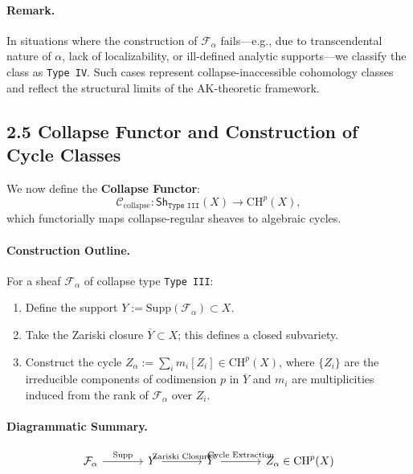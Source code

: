 \documentclass[11pt]{article}
\begin{document}
\paragraph{Remark.}
In situations where the construction of $\mathcal{F}_\alpha$ fails—e.g., due to transcendental nature of $\alpha$, lack of localizability, or ill-defined analytic supports—we classify the class as \texttt{Type IV}. Such cases represent collapse-inaccessible cohomology classes and reflect the structural limits of the AK-theoretic framework.

\subsection{2.5 Collapse Functor and Construction of Cycle Classes}

We now define the \textbf{Collapse Functor}:
\[
\mathcal{C}_{\text{collapse}} : \mathsf{Sh}_{\texttt{Type III}}(X) \longrightarrow \mathrm{CH}^p(X),
\]
which functorially maps collapse-regular sheaves to algebraic cycles.

\paragraph{Construction Outline.} For a sheaf $\mathcal{F}_\alpha$ of collapse type \texttt{Type III}:
\begin{enumerate}
  \item Define the support $Y := \mathrm{Supp}(\mathcal{F}_\alpha) \subset X$.
  \item Take the Zariski closure $\overline{Y} \subset X$; this defines a closed subvariety.
  \item Construct the cycle $Z_\alpha := \sum_i m_i [Z_i] \in \mathrm{CH}^p(X)$, where $\{Z_i\}$ are the irreducible components of codimension $p$ in $\overline{Y}$ and $m_i$ are multiplicities induced from the rank of $\mathcal{F}_\alpha$ over $Z_i$.
\end{enumerate}

\paragraph{Diagrammatic Summary.}
\[
\begin{tikzcd}[row sep=large, column sep=large]
\mathcal{F}_\alpha
\arrow[r, "\mathrm{Supp}"] 
& Y \arrow[r, "\text{Zariski Closure}"]
& \overline{Y} \arrow[r, "\text{Cycle Extraction}"]
& Z_\alpha \in \mathrm{CH}^p(X)
\end{tikzcd}
\]
\end{document}
